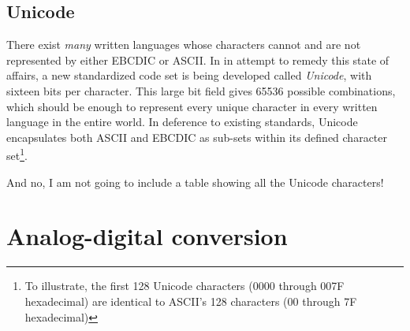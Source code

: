 \filbreak
\subsection{Unicode}

There exist \textit{many} written languages whose characters cannot and are not represented by either EBCDIC or ASCII.  In in attempt to remedy this state of affairs, a new standardized code set is being developed called \textit{Unicode}, with sixteen bits per character.  This large bit field gives 65536 possible combinations, which should be enough to represent every unique character in every written language in the entire world.  In deference to existing standards, Unicode encapsulates both ASCII and EBCDIC as sub-sets within its defined character set\footnote{To illustrate, the first 128 Unicode characters (0000 through 007F hexadecimal) are identical to ASCII's 128 characters (00 through 7F hexadecimal)}.

\vskip 10pt

And no, I am not going to include a table showing all the Unicode characters!





























\filbreak
\section{Analog-digital conversion}

